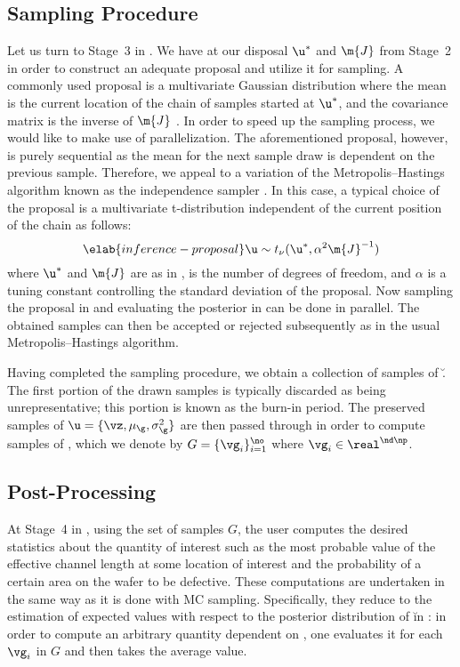 \subsection{Sampling Procedure}

Let us turn to Stage~3 in . We have at our disposal
$\u^*$ and $\m{J}$ from Stage~2 in order to construct an adequate proposal and
utilize it for sampling. A commonly used proposal is a multivariate Gaussian
distribution where the mean is the current location of the chain of samples
started at $\u^*$, and the covariance matrix is the inverse of $\m{J}$
\cite{gelman2004}. In order to speed up the sampling process, we would like to
make use of parallelization. The aforementioned proposal, however, is purely
sequential as the mean for the next sample draw is dependent on the previous
sample. Therefore, we appeal to a variation of the Metropolis--Hastings
algorithm known as the independence sampler \cite{gelman2004}. In this case, a
typical choice of the proposal is a multivariate t-distribution independent of
the current position of the chain as follows:
\begin{equation} \elab{inference-proposal}
  \u \sim t_\nu(\u^*, \alpha^2 \m{J}^{-1})
\end{equation}
where $\u^*$ and $\m{J}$ are as in , \nu is the
number of degrees of freedom, and $\alpha$ is a tuning constant controlling the
standard deviation of the proposal. Now sampling the proposal in
 and evaluating the posterior in
 can be done in parallel. The obtained samples can
then be accepted or rejected subsequently as in the usual Metropolis--Hastings
algorithm.

Having completed the sampling procedure, we obtain a collection of samples of
\u. The first portion of the drawn samples is typically discarded as being
unrepresentative; this portion is known as the burn-in period. The preserved
samples of $\u = \{ \vz, \mu_\g, \sigma^2_\g \}$ are then passed through
 in order to compute samples of \g, which we denote by
$G = \{ \vg_i \}_{i = 1}^\no$ where $\vg_i \in \real^{\nd \np}$.

\subsection{Post-Processing}

At Stage~4 in , using the set of samples $G$, the user
computes the desired statistics about the quantity of interest such as the most
probable value of the effective channel length at some location of interest and
the probability of a certain area on the wafer to be defective. These
computations are undertaken in the same way as it is done with \ac{MC} sampling.
Specifically, they reduce to the estimation of expected values with respect to
the posterior distribution of \u in : in order to
compute an arbitrary quantity dependent on \g, one evaluates it for each $\vg_i$
in $G$ and then takes the average value.

